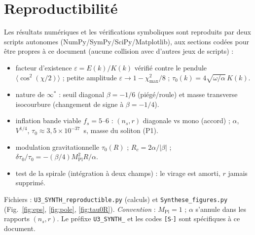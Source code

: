 \documentclass[11pt,a4paper]{article}
\newcommand{\Mpl}{M_{\mathrm{Pl}}}
\theoremstyle{definition}
\begin{document}
\section*{Reproductibilit\'e}
Les r\'esultats num\'eriques et les v\'erifications symboliques sont reproduits par deux scripts
autonomes (NumPy/SymPy/SciPy/Matplotlib), aux sections cod\'ees pour \^etre propres \`a ce
document (aucune collision avec d'autres jeux de scripts) :
\begin{itemize}
\item[{\texttt{[S1]}}] facteur d'existence $\varepsilon=E(k)/K(k)$ v\'erifi\'e contre le pendule $\langle\cos^2(\chi/2)\rangle$ ; petite amplitude $\varepsilon\to1-\chi_{\max}^2/8$ ; $\tau_0(k)=4\sqrt{\omega/\alpha}\,K(k)$.
\item[{\texttt{[S2]}}] nature de $\infty^*$ : seuil diagonal $\beta=-1/6$ (pi\'eg\'e/roule) et masse transverse isocourbure (changement de signe \`a $\beta=-1/4$).
\item[{\texttt{[S3]}}] inflation bande viable $f_s=5$--$6$ : $(n_s,r)$ diagonale vs mono (accord) ; $\alpha$, $V^{1/4}$, $\tau_0\approx3{,}5\times10^{-37}$~s, masse du soliton (P1).
\item[{\texttt{[S4]}}] modulation gravitationnelle $\tau_0(R)$ ; $R_c=2\alpha/|\beta|$ ; $\delta\tau_0/\tau_0=-(\beta/4)\Mpl^2R/\alpha$.
\item[{\texttt{[S5]}}] test de la spirale (int\'egration \`a deux champs) : le virage est amorti, $r$ jamais supprim\'e.
\end{itemize}
Fichiers : \texttt{U3\_SYNTH\_reproductible.py} (calculs) et \texttt{Synthese\_figures.py}
(Fig.~\ref{fig:eps}, \ref{fig:pole}, \ref{fig:tau0R}). \emph{Convention} : $\Mpl=1$ ; $\alpha$
s'annule dans les rapports $(n_s,r)$. Le pr\'efixe \texttt{U3\_SYNTH\_} et les codes
\texttt{[S$\cdot$]} sont sp\'ecifiques \`a ce document.
\end{document}

